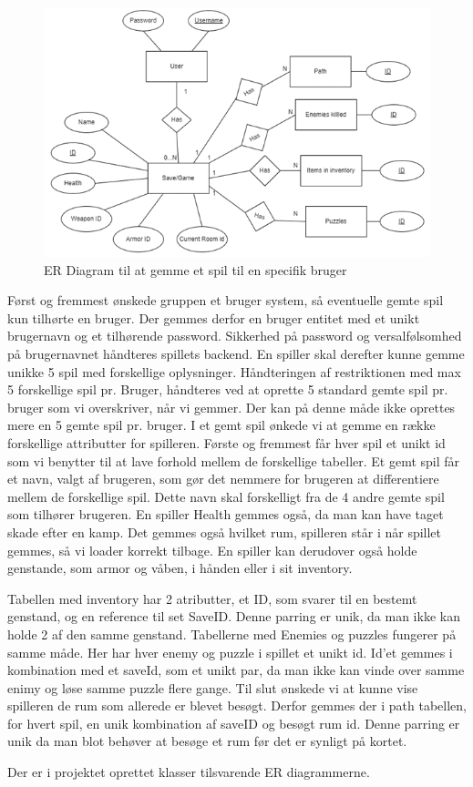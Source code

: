 \begin{figure}[h]
\centering
\includegraphics[width = \textwidth]{02-Body/Images/ER-GameSave.PNG}
\caption{ER Diagram til at gemme et spil til en specifik bruger}
\label{fig:ER-GameSave}
\end{figure}

Først og fremmest ønskede gruppen et bruger system, så eventuelle gemte spil kun tilhørte en bruger.
Der gemmes derfor en bruger entitet med et unikt brugernavn og et tilhørende password.
Sikkerhed på password og versalfølsomhed på brugernavnet håndteres spillets backend.
En spiller skal derefter kunne gemme unikke 5 spil med forskellige oplysninger.
Håndteringen af restriktionen med max 5 forskellige spil pr. Bruger, håndteres ved at oprette 5 standard gemte spil pr. bruger som vi overskriver, når vi gemmer. Der kan på denne måde ikke oprettes mere en 5 gemte spil pr. bruger.
I et gemt spil ønkede vi at gemme en række forskellige attributter for spilleren.
Første og fremmest får hver spil et unikt id som vi benytter til at lave forhold mellem de forskellige tabeller.
Et gemt spil får et navn, valgt af brugeren, som gør det nemmere for brugeren at differentiere mellem de forskellige spil. Dette navn skal forskelligt fra de 4 andre gemte spil som tilhører brugeren.
En spiller Health gemmes også, da man kan have taget skade efter en kamp. Det gemmes også hvilket rum, spilleren står i når spillet gemmes, så vi loader korrekt tilbage. 
En spiller kan derudover også holde genstande, som armor og våben, i hånden eller i sit inventory.

Tabellen med inventory har 2 atributter, et ID, som svarer til en bestemt genstand, og en reference til set SaveID. Denne parring er unik, da man ikke kan holde 2 af den samme genstand.
Tabellerne med Enemies og puzzles fungerer på samme måde. Her har hver enemy og puzzle i spillet et unikt id. Id’et gemmes i kombination med et saveId, som et unikt par, da man ikke kan vinde over samme enimy og løse samme puzzle flere gange.
Til slut ønskede vi at kunne vise spilleren de rum som allerede er blevet besøgt.
Derfor gemmes der i path tabellen, for hvert spil, en unik kombination af saveID og besøgt rum id. Denne parring er unik da man blot behøver at besøge et rum før det er synligt på kortet. 

Der er i projektet oprettet klasser tilsvarende ER diagrammerne.
